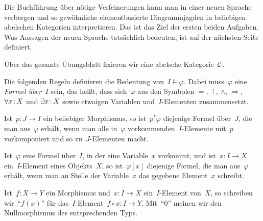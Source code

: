 \documentclass{uebblatt}
\begin{document}
Die Buchführung über nötige Verfeinerungen kann man in einer neuen Sprache
verbergen und so gewöhnliche elementbasierte Diagrammjagden in beliebigen
abelschen Kategorien interpretieren. Das ist das Ziel der ersten beiden
Aufgaben. Was Aussagen der neuen Sprache tatsächlich bedeuten, ist auf der
nächsten Seite definiert.

Über das gesamte Übungsblatt fixieren wir eine abelsche Kategorie~$\mathcal{C}$.

\newpage

Die folgenden Regeln definieren die Bedeutung von~$I \models \varphi$.
Dabei muss~$\varphi$ eine \emph{Formel über~$I$} sein, das heißt, dass
sich~$\varphi$ aus den Symbolen $=$, $\top$, $\wedge$, $\Rightarrow$,
$\forall x\,{:}\,X$ und $\exists x\,{:}\,X$
sowie etwaigen Variablen und~$I$-Elementen zusammensetzt.

Ist~$p : J \to I$ ein beliebiger Morphismus, so ist~$p^*\varphi$ diejenige
Formel über~$J$, die man aus~$\varphi$ erhält, wenn man alle in~$\varphi$
vorkommenden~$I$-Elemente mit~$p$ vorkomponiert und so zu~$J$-Elementen
macht.

Ist~$\varphi$ eine Formel über~$I$, in der eine Variable~$x$ vorkommt, und
ist~$x : I \to X$ ein~$I$-Element eines Objekts~$X$, so ist~$\varphi[x]$
diejenige Formel, die man aus~$\varphi$ erhält, wenn man an Stelle der
Variable~$x$ das gegebene Element~$x$ schreibt.

Ist~$f : X \to Y$ ein Morphismus und~$x : I \to X$ ein~$I$-Element von~$X$, so
schreiben wir~"`$f(x)$"' für das~$I$-Element~$f \circ x : I \to Y$. Mit~"`$0$"'
meinen wir den Nullmorphismus des entsprechenden Typs.
\begin{center}\end{center}
\vspace{\aufgabenskip}
\end{document}
